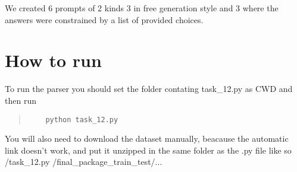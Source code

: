 \documentclass[11pt]{article}
\begin{document}
We created 6 prompts of 2 kinds 3 in free generation style and 3 where the answers were constrained by a list of provided 
choices.

\section{How to run}
To run the parser you should set the folder contating task\_12.py as CWD and then run
\begin{quote}
  \begin{verbatim}
    python task_12.py
  \end{verbatim}
\end{quote}
\noindent You will also need to download the dataset manually, beacause the automatic link doesn't work, and put it unzipped in the 
same folder as the .py file like so /task\_12.py /final\_package\_train\_test/...

\newpage
\end{document}
